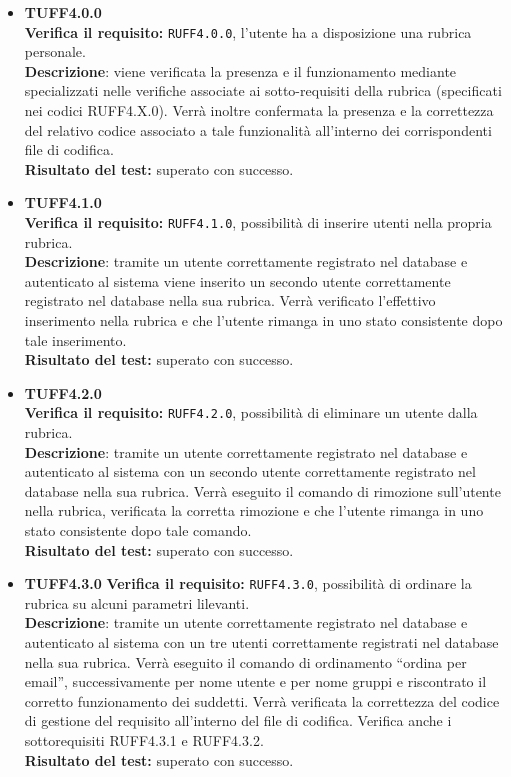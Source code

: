\begin{itemize}
\item \textbf{TUFF4.0.0}\\
\textbf{Verifica il requisito:} \texttt{RUFF4.0.0}, l'utente ha a disposizione una rubrica personale.\\
\textbf{Descrizione}: viene verificata la presenza e il funzionamento mediante  specializzati nelle verifiche associate ai sotto-requisiti della rubrica (specificati nei codici RUFF4.X.0). Verrà inoltre confermata la presenza e la correttezza del relativo codice associato a tale funzionalità all'interno dei corrispondenti file di codifica.\\
\textbf{Risultato del test:} superato con successo.

\item \textbf{TUFF4.1.0}\\
\textbf{Verifica il requisito:} \texttt{RUFF4.1.0}, possibilità di inserire utenti nella propria rubrica.\\
\textbf{Descrizione}: tramite un utente  correttamente registrato nel database e autenticato al sistema viene inserito un secondo utente  correttamente registrato nel database nella sua rubrica. Verrà verificato l'effettivo inserimento nella rubrica e che l'utente rimanga in uno stato consistente dopo tale inserimento.\\
\textbf{Risultato del test:} superato con successo.

\item \textbf{TUFF4.2.0}\\
\textbf{Verifica il requisito:} \texttt{RUFF4.2.0}, possibilità di eliminare un utente dalla rubrica.\\
\textbf{Descrizione}: tramite un utente  correttamente registrato nel database e autenticato al sistema con un secondo utente  correttamente registrato nel database nella sua rubrica. Verrà eseguito il comando di rimozione sull'utente nella rubrica, verificata la corretta rimozione e che l'utente rimanga in uno stato consistente dopo tale comando.\\
\textbf{Risultato del test:} superato con successo.

\item \textbf{TUFF4.3.0}
\textbf{Verifica il requisito:} \texttt{RUFF4.3.0}, possibilità di ordinare la rubrica su alcuni parametri lilevanti.\\
\textbf{Descrizione}: tramite un utente  correttamente registrato nel database e autenticato al sistema con un tre utenti  correttamente registrati nel database nella sua rubrica. Verrà eseguito il comando di ordinamento ``ordina per email'', successivamente per nome utente e per nome gruppi e riscontrato il corretto funzionamento dei suddetti. Verrà verificata la correttezza del codice di gestione del requisito all'interno del file di codifica. Verifica anche i sottorequisiti RUFF4.3.1 e RUFF4.3.2. \\
\textbf{Risultato del test:} superato con successo.


\end{itemize}
